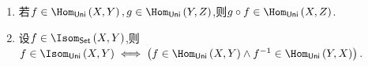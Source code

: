 \begin{proposition}{}{}
	\begin{enumerate}
		\item 若$f\in\Hom_{\mathsf{Uni}}\left(X,Y\right),g\in\Hom_{\mathsf{Uni}}\left(Y,Z\right)$,则$g\circ f\in\Hom_{\mathsf{Uni}}\left(X,Z\right)$.
		\item 设$f\in\Isom_{\mathsf{Set}}\left(X,Y\right)$,则$f\in\Isom_{\mathsf{Uni}}\left(X,Y\right)\iff\left(f\in\Hom_{\mathsf{Uni}}\left(X,Y\right)\wedge f^{-1}\in\Hom_{\mathsf{Uni}}\left(Y,X\right)\right)$.
	\end{enumerate}
\end{proposition}
